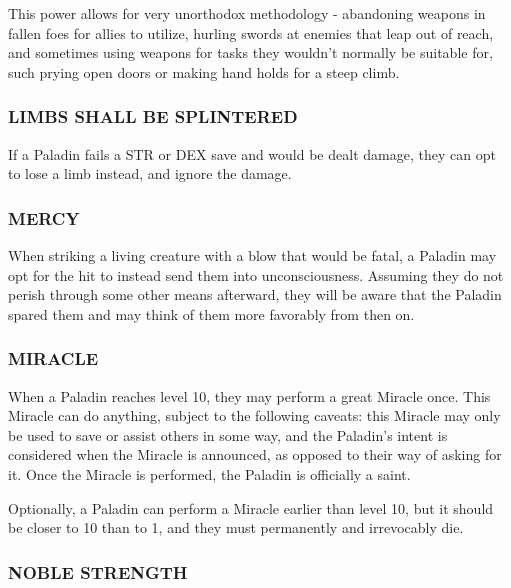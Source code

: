 \documentclass[twoside]{article}
\begin{document}
\bigbreak

This power allows for very unorthodox methodology - abandoning weapons in fallen foes for allies to utilize, hurling swords at enemies that leap out of reach, and sometimes using weapons for tasks they wouldn't normally be suitable for, such prying open doors or making hand holds for a steep climb.

\subsubsection*{\footnotesize{L}\scriptsize{IMBS} \footnotesize{S}\scriptsize{HALL BE} \footnotesize{S}\scriptsize{PLINTERED}\normalsize}

If a Paladin fails a STR or DEX save and would be dealt damage, they can opt to lose a limb instead, and ignore the damage.

\subsubsection*{\footnotesize{M}\scriptsize{ERCY}\normalsize}

When striking a living creature with a blow that would be fatal, a Paladin may opt for the hit to instead send them into unconsciousness. Assuming they do not perish through some other means afterward, they will be aware that the Paladin spared them and may think of them more favorably from then on.

\subsubsection*{\footnotesize{M}\scriptsize{IRACLE}\normalsize}

When a Paladin reaches level 10, they may perform a great Miracle once. This Miracle can do anything, subject to the following caveats: this Miracle may only be used to save or assist others in some way, and the Paladin's intent is considered when the Miracle is announced, as opposed to their way of asking for it. Once the Miracle is performed, the Paladin is officially a saint.

\bigbreak

Optionally, a Paladin can perform a Miracle earlier than level 10, but it should be closer to 10 than to 1, and they must permanently and irrevocably die.

\subsubsection*{\footnotesize{N}\scriptsize{OBLE} \footnotesize{S}\scriptsize{TRENGTH}\normalsize}
\end{document}
